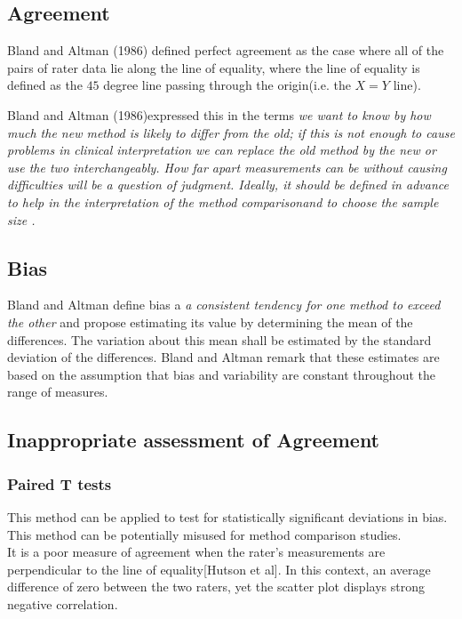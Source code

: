\documentclass{report}
\begin{document}
\subsection{Agreement} Bland and Altman (1986) defined perfect
agreement as the case where all of the pairs of rater data lie
along the line of equality, where the line of equality is defined
as the $45$ degree line passing through the origin(i.e. the $X=Y$
line).

Bland and Altman (1986)expressed this in the terms \emph{we want
	to know by how much the new method is likely to differ from the
	old; if this is not enough to cause problems in clinical
	interpretation we can replace the old method by the new or use the
	two interchangeably. How far apart measurements can be without
	causing difficulties will be a question of judgment. Ideally, it
	should be defined in advance to help in the interpretation of the
	method comparisonand to choose the sample size .}
\subsection{Bias}
Bland and Altman define bias a \emph{a consistent tendency for one
	method to exceed the other} and propose estimating its value
by determining the mean of the differences. The variation about
this mean shall be estimated by the  standard deviation of the
differences. Bland and Altman remark that these estimates are based on the
assumption that bias and variability are constant throughout the
range of measures.
\subsection{Inappropriate assessment of Agreement}
\subsubsection{Paired T tests} This method can be applied to test for
statistically significant deviations in bias. This method can be
potentially misused for method comparison studies.
\\It is a poor measure of agreement when the rater's measurements
are perpendicular to the line of equality[Hutson et al]. In this
context, an average difference of zero between the two raters, yet
the scatter plot displays strong negative correlation.
\end{document}
